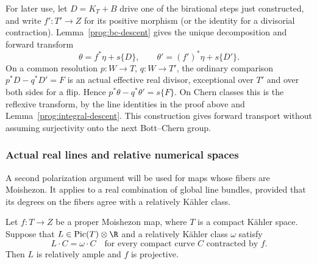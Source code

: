 For later use, let \(D=K_T+B\) drive one of the birational steps just
constructed, and write \(f':T'\to Z\) for its positive morphism
(or the identity for a divisorial contraction). Lemma~\ref{prog:bc-descent}
gives the unique decomposition and forward transform
\begin{equation}
 \theta=f^*\eta+s\{D\},\qquad
 \theta'=(f')^*\eta+s\{D'\}.
 \label{prog:ordinary-forward-transport}
\end{equation}
On a common resolution \(p:W\to T\), \(q:W\to T'\), the ordinary
comparison \(p^*D-q^*D'=F\) is an actual effective real divisor,
exceptional over \(T'\) and over both sides for a flip. Hence
\(p^*\theta-q^*\theta'=s\{F\}\). On Chern classes this is the
reflexive transform, by the line identities in the proof above and
Lemma~\ref{prog:integral-descent}. This construction gives forward
transport without assuming surjectivity onto the next Bott--Chern group.

\subsubsection{Actual real lines and relative numerical spaces}

A second polarization argument will be used for maps whose fibers are
Moishezon. It applies to a real combination of global line bundles,
provided that its degrees on the fibers agree with a relatively Kähler
class.

\begin{lemma}
\label{prog:actual-line-polarization}
Let $f:T\to Z$ be a proper Moishezon map, where $T$ is a compact
K\"ahler space. Suppose that $L\in\operatorname{Pic}(T)\otimes\R$
and a relatively K\"ahler class $\omega$ satisfy
\[
 L\cdot C=\omega\cdot C
 \quad\text{for every compact curve $C$ contracted by $f$.}
\]
Then $L$ is relatively ample and $f$ is projective.
\end{lemma}

